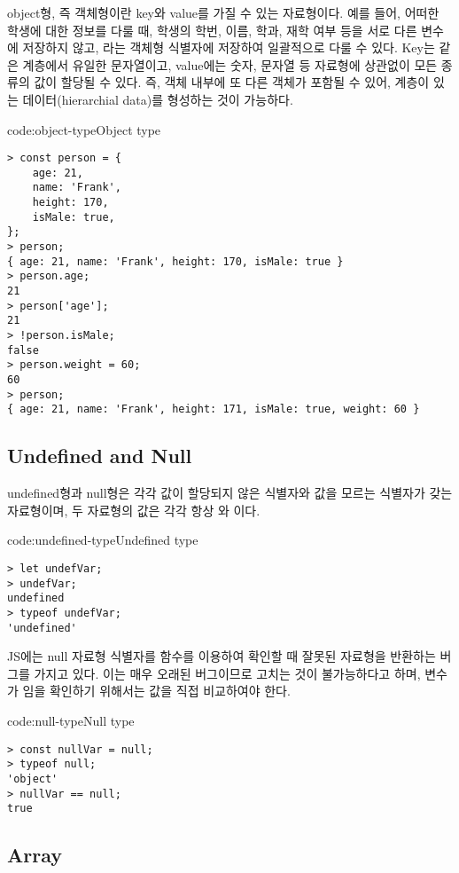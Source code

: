 object형, 즉 객체형이란 key와 value를 가질 수 있는 자료형이다. 예를 들어, 어떠한 학생에 대한 정보를 다룰 때, 학생의 학번, 이름, 학과, 재학 여부 등을 서로 다른 변수에 저장하지 않고, 라는 객체형 식별자에 저장하여 일괄적으로 다룰 수 있다. Key는 같은 계층에서 유일한 문자열이고, value에는 숫자, 문자열 등 자료형에 상관없이 모든 종류의 값이 할당될 수 있다. 즉, 객체 내부에 또 다른 객체가 포함될 수 있어, 계층이 있는 데이터(hierarchial data)를 형성하는 것이 가능하다.

\begin{code}{code:object-type}{Object type}
\begin{verbatim}
> const person = {
    age: 21,
    name: 'Frank',
    height: 170,
    isMale: true,
};
> person;
{ age: 21, name: 'Frank', height: 170, isMale: true }
> person.age;
21
> person['age'];
21
> !person.isMale;
false
> person.weight = 60;
60
> person;
{ age: 21, name: 'Frank', height: 171, isMale: true, weight: 60 }
\end{verbatim}
\end{code}

\subsection*{Undefined and Null}

undefined형과 null형은 각각 값이 할당되지 않은 식별자와 값을 모르는 식별자가 갖는 자료형이며, 두 자료형의 값은 각각 항상 와 이다.

\begin{code}{code:undefined-type}{Undefined type}
\begin{verbatim}
> let undefVar;
> undefVar;
undefined
> typeof undefVar;
'undefined'
\end{verbatim}
\end{code}

JS에는 null 자료형 식별자를  함수를 이용하여 확인할 때 잘못된 자료형을 반환하는 버그를 가지고 있다. 이는 매우 오래된 버그이므로 고치는 것이 불가능하다고 하며, 변수가 임을 확인하기 위해서는 값을 직접 비교하여야 한다.

\begin{code}{code:null-type}{Null type}
\begin{verbatim}
> const nullVar = null;
> typeof null;
'object'
> nullVar == null;
true
\end{verbatim}
\end{code}

\subsection*{Array}

